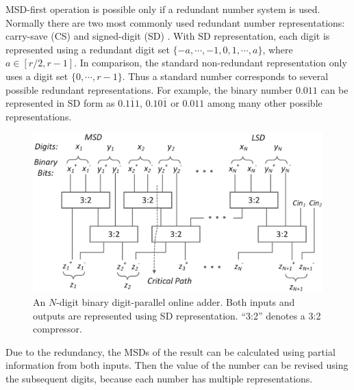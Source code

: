 \documentclass[conference]{IEEEtran}
\begin{document}
MSD-first operation is possible only if a redundant number system is used. Normally there are two most commonly used redundant number representations: carry-save (CS) \cite{CSadder} and signed-digit (SD) \cite{RedundantNumber}. With SD representation, each digit is represented using a redundant digit set $\{-a, \cdots,-1,0, 1, \cdots, a\}$, where $a\in[r/2,r-1]$. In comparison, the standard non-redundant representation only uses a digit set $\{0,\cdots,r-1\}$. Thus a standard number corresponds to several possible redundant representations. For example, the binary number $0.011$ can be represented in SD form as $0.1\overline{1}1$, $0.10\overline{1}$ or $0.011$ among many other possible representations.\vspace{-0.5ex}
%
\vspace{-.5ex}
\begin{figure}[tbp]
  \centering
  \includegraphics[width=.45\textwidth]{./Figures/SDAdder.eps}
  \vspace{-2ex}
  \caption{An $N$-digit binary digit-parallel online adder. Both inputs and outputs are represented using SD representation. ``3:2'' denotes a 3:2 compressor.}
    \vspace{-2ex}
  \label{Fig:Radix2SD_adder}
\end{figure}

Due to the redundancy, the MSDs of the result can be calculated using partial information from both inputs. Then the value of the number can be revised using the subsequent digits, because each number has multiple representations.\vspace{-0.5ex}
\end{document}

